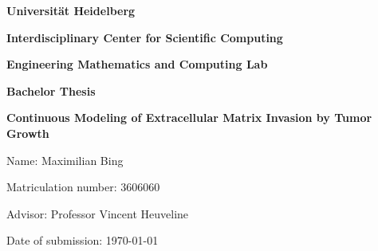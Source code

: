\begin{titlepage}
    \begin{center}
	{\Large\textbf{Universität Heidelberg}\par}
    {\Large\textbf{Interdisciplinary Center for Scientific Computing} \par}
    {\Large\textbf{Engineering Mathematics and Computing Lab}\par}
	\vspace{3cm}
	{\Large\textbf{Bachelor Thesis}\par}
    \vspace{1cm}
	{\Huge\bfseries Continuous Modeling of Extracellular Matrix Invasion by Tumor Growth  \par}
    \end{center}
    \vspace{6cm}
	
    \raggedright{\Large Name: Maximilian Bing\par}
    {\Large Matriculation number: 3606060\par}
    {\Large Advisor: Professor Vincent Heuveline\par}
    {\Large Date of submission: \today\par}
\end{titlepage}
